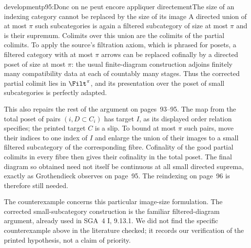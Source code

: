 \begin{dcomment}{development}{p95:Donc on ne peut encore appliquer directement}{The size of an indexing category cannot be replaced by the size of its image}
A directed union of at most $\pi$ such subcategories is again a filtered subcategory of size at most $\pi$ and is their supremum. Colimits over this union are the colimits of the partial colimits. To apply the source's filtration axiom, which is phrased for posets, a filtered category with at most $\pi$ arrows can be replaced cofinally by a directed poset of size at most $\pi$: the usual finite-diagram construction adjoins finitely many compatibility data at each of countably many stages. Thus the corrected partial colimit lies in $\Filt^\pi$, and its presentation over the poset of small subcategories is perfectly adapted.

This also repairs the rest of the argument on pages~93--95. The map from the total poset of pairs $(i,D\subset C_i)$ has target $I$, as its displayed order relation specifies; the printed target $C$ is a slip. To bound at most $\pi$ such pairs, move their indices to one index of $I$ and enlarge the union of their images to a small filtered subcategory of the corresponding fibre. Cofinality of the good partial colimits in every fibre then gives their cofinality in the total poset. The final diagram so obtained need not itself be continuous at all small directed suprema, exactly as Grothendieck observes on page~95. The reindexing on page~96 is therefore still needed.

The counterexample concerns this particular image-size formulation. The corrected small-subcategory construction is the familiar filtered-diagram argument, already used in SGA~4 I, 9.13.1. We did not find the specific counterexample above in the literature checked; it records our verification of the printed hypothesis, not a claim of priority.
\end{dcomment}

